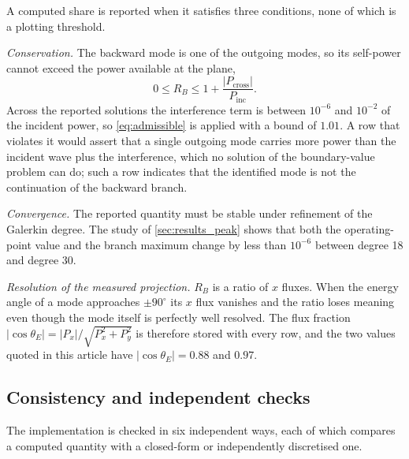 A computed share is reported when it satisfies three conditions, none of which
is a plotting threshold.

\emph{Conservation.}  The backward mode is one of the outgoing modes, so its
self-power cannot exceed the power available at the plane,
\begin{equation}
\label{eq:admissible}
0\le R_B\le1+\frac{|P_{\text{cross}}|}{P_{\text{inc}}} .
\end{equation}
Across the reported solutions the interference term is between $10^{-6}$ and
$10^{-2}$ of the incident power, so \eqref{eq:admissible} is applied with a
bound of $1.01$.  A row that violates it would assert that a single outgoing
mode carries more power than the incident wave plus the interference, which no
solution of the boundary-value problem can do; such a row indicates that the
identified mode is not the continuation of the backward branch.

\emph{Convergence.}  The reported quantity must be stable under refinement of
the Galerkin degree.  The study of \cref{sec:results_peak} shows that both the
operating-point value and the branch maximum change by less than $10^{-6}$
between degree 18 and degree 30.

\emph{Resolution of the measured projection.}  $R_B$ is a ratio of $x$ fluxes.
When the energy angle of a mode approaches $\pm90^{\circ}$ its $x$ flux
vanishes and the ratio loses meaning even though the mode itself is perfectly
well resolved.  The flux fraction
$|\cos\theta_E|=|P_x|/\sqrt{P_x^2+P_y^2}$ is therefore stored with every row,
and the two values quoted in this article have $|\cos\theta_E|=0.88$ and $0.97$.

\subsection{Consistency and independent checks}
\label{sec:numerics_verification}

The implementation is checked in six independent ways, each of which compares
a computed quantity with a closed-form or independently discretised one.

